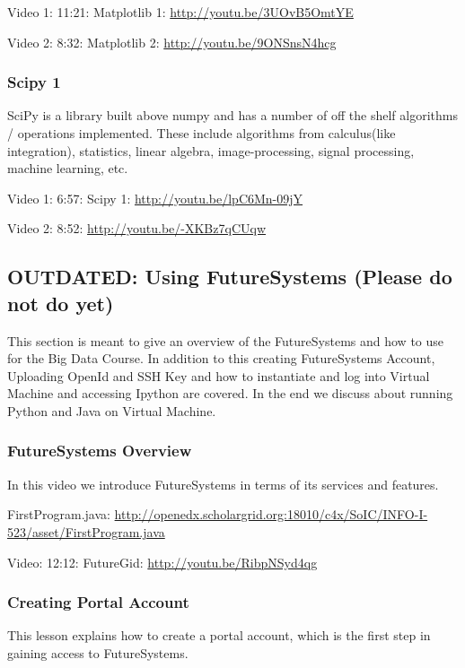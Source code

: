 Video 1: 11:21: Matplotlib 1: \url{http://youtu.be/3UOvB5OmtYE}

Video 2: 8:32: Matplotlib 2: \url{http://youtu.be/9ONSnsN4hcg}

\subsubsection{Scipy 1}\label{scipy-1}

SciPy is a library built above numpy and has a number of off the shelf
algorithms / operations implemented. These include algorithms from
calculus(like integration), statistics, linear algebra,
image-processing, signal processing, machine learning, etc.

Video 1: 6:57: Scipy 1: \url{http://youtu.be/lpC6Mn-09jY}

Video 2: 8:52: \url{http://youtu.be/-XKBz7qCUqw}

\subsection{OUTDATED: Using FutureSystems (Please do not do
yet)}\label{outdated-using-futuresystems-please-do-not-do-yet}

This section is meant to give an overview of the FutureSystems and how
to use for the Big Data Course. In addition to this creating
FutureSystems Account, Uploading OpenId and SSH Key and how to
instantiate and log into Virtual Machine and accessing Ipython are
covered. In the end we discuss about running Python and Java on Virtual
Machine.

\subsubsection{FutureSystems Overview}\label{futuresystems-overview}

In this video we introduce FutureSystems in terms of its services and
features.

FirstProgram.java:
\url{http://openedx.scholargrid.org:18010/c4x/SoIC/INFO-I-523/asset/FirstProgram.java}

Video: 12:12: FutureGid: \url{http://youtu.be/RibpNSyd4qg}

\subsubsection{Creating Portal Account}\label{creating-portal-account}

This lesson explains how to create a portal account, which is the first
step in gaining access to FutureSystems.


